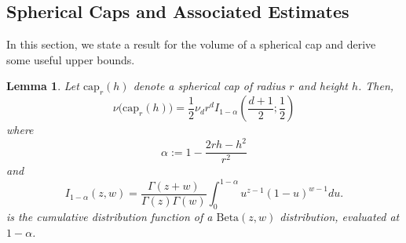 \documentclass[11pt,twoside]{article}
\newtheorem{lemma}{Lemma}
\theoremstyle{definition}
\newcommand{\1}{\mathbbm{1}}
\begin{document}
\subsection{Spherical Caps and Associated Estimates}
\label{sec:caps}
In this section, we state a result for the volume of a spherical cap and derive some 
useful upper bounds. 
\begin{lemma}
	\label{lem: volume_of_spherical_cap}
	Let $\mathrm{cap}_r(h)$ denote a spherical cap of radius $r$ and height $h$. Then, 
	\begin{equation*}
	\nu\bigl( \mathrm{cap}_r(h)  \bigr) = \frac{1}{2} \nu_d r^d I_{1 - \alpha}\left(\frac{d + 1}{2}; \frac{1}{2}\right)
	\end{equation*}
	where
	\begin{equation*}
	\alpha := 1 - \frac{2 r h - h^2}{r^2}
	\end{equation*}
	and
	\begin{equation*}
	I_{1 - \alpha}(z,w) = \frac{\Gamma(z + w)}{\Gamma(z) \Gamma(w)} \int_{0}^{1 - \alpha} u^{z - 1} (1 - u)^{w - 1} du.
	\end{equation*}
	is the cumulative distribution function of a $\mathrm{Beta}(z,w)$ distribution, evaluated at $1 - \alpha$. 
\end{lemma}
\end{document}
